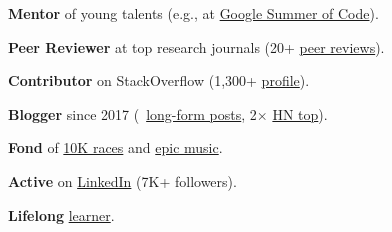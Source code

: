 \documentclass{files/CV/cesar}
\begin{document}
\textbf{Mentor} of young talents (e.g., at \href{https://summerofcode.withgoogle.com/archive/2021/projects/6679675211874304}{Google Summer of Code}).

\textbf{Peer Reviewer} at top research journals (20+ \href{https://www.cesarsotovalero.net/service#academic-reviewer}{peer reviews}).

\textbf{Contributor} on StackOverflow (1,300+ \href{https://stackoverflow.com/users/10480869/cesarsotovalero}{profile}).

\textbf{Blogger} since 2017 (\blogposts~\href{https://www.cesarsotovalero.net/blog}{long-form posts}, 2$\times$ \href{https://news.ycombinator.com/favorites?id=cesarsotovalero}{HN top}).

\textbf{Fond} of \href{https://www.cesarsotovalero.net/races.html}{10K races} and \href{https://open.spotify.com/playlist/1E4xBA3IYuTjtTphOV16FM}{epic music}.

\textbf{Active} on \href{https://www.cesarsotovalero.net/linkedin}{LinkedIn} (7K+ followers).

\textbf{Lifelong} \href{https://www.cesarsotovalero.net/courses.html}{learner}.
\end{document}
